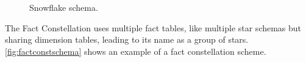\begin{figure}[!htb]
  \caption{Snowflake schema.}\label{fig:snowflakeschema}
  \vspace{2mm}
  \begin{center}
  \end{center}
  \vspace{1mm}
  \legenda{}
\end{figure}

The Fact Constellation uses multiple fact tables, like multiple star schemas but sharing dimension tables, leading to its name as a group of stars.
\autoref{fig:factconstschema} shows an example of a fact constellation scheme.

